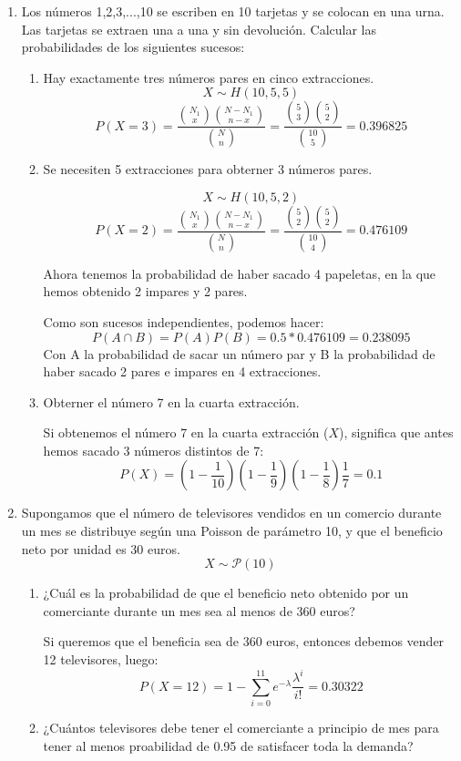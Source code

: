 \documentclass[11pt]{article}
\begin{document}
\begin{enumerate}
\begin{enumerate}
\end{enumerate}

\item Los números 1,2,3,...,10 se escriben en 10 tarjetas y se colocan en una urna. Las tarjetas se extraen una a una y sin devolución. Calcular las probabilidades de los siguientes sucesos:

\begin{enumerate}
\item Hay exactamente tres números pares en cinco extracciones.
\[
X \sim H(10,5,5)
\]
\[
P(X=3)=\frac{\binom{N_1}{x}\binom{N-N_1}{n-x}}{\binom{N}{n}}=\frac{\binom{5}{3}\binom{5}{2}}{\binom{10}{5}}=0.396825
\]
\item Se necesiten 5 extracciones para obterner 3 números pares.

\[
X \sim H(10, 5, 2)
\]
\[
P(X=2)=\frac{\binom{N_1}{x}\binom{N-N_1}{n-x}}{\binom{N}{n}}=\frac{\binom{5}{2}\binom{5}{2}}{\binom{10}{4}}=0.476109
\]

Ahora tenemos la probabilidad de haber sacado 4 papeletas, en la que hemos obtenido 2 impares y 2 pares. 

Como son sucesos independientes, podemos hacer:
\[
P(A\cap B)=P(A)P(B)=0.5*0.476109=0.238095
\]
Con A la probabilidad de sacar un número par y B la probabilidad de haber sacado 2 pares e impares en 4 extracciones.

\item Obterner el número 7 en la cuarta extracción.

Si obtenemos el número 7 en la cuarta extracción ($X$), significa que antes hemos sacado 3 números distintos de 7: 
\[
P(X)=(1-\frac{1}{10})(1-\frac{1}{9})(1-\frac{1}{8})\frac{1}{7} = 0.1
\]
\end{enumerate}

\item Supongamos que el número de televisores vendidos en un comercio durante un mes se distribuye según una Poisson de parámetro 10, y que el beneficio neto por unidad es 30 euros.
\[
X \sim \mathcal{P}(10)
\]
\begin{enumerate}
\item ¿Cuál es la probabilidad de que el beneficio neto obtenido por un comerciante durante un mes sea al menos de 360 euros?

Si queremos que el beneficia sea de 360 euros, entonces debemos vender 12 televisores, luego:
\[
P(X=12)=1-\sum_{i=0}^{11}e^{-\lambda}\frac{\lambda^i}{i!}=0.30322
\]

\item ¿Cuántos televisores debe tener el comerciante a principio de mes para tener al menos proabilidad de 0.95 de satisfacer toda la demanda?
\end{enumerate}

\end{enumerate}
\end{document}
